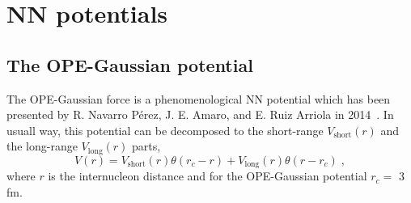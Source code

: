 \chapter{NN potentials}
\label{potentials}
\section{The OPE-Gaussian potential}
\label{OPEG-potential}
The OPE-Gaussian force is a phenomenological NN potential which has been presented by R. Navarro P{\' e}rez, J. E. Amaro, and E. Ruiz Arriola in 2014~\cite{NavarroPerez2014}. In usuall way, this potential can be decomposed to the short-range $V_{\mathrm{short}}(r)$ and the long-range $V_{\mathrm{long}}(r)$ parts,
\begin{equation}
V(r) = V_{\mathrm{short}}(r)\theta(r_{c} - r) + V_{\mathrm{long}}(r)\theta(r - r_{c})\;,
\end{equation}
\label{eq_31}
where $r$ is the internucleon distance and for the OPE-Gaussian potential $r_{c} =$ 3 fm.

